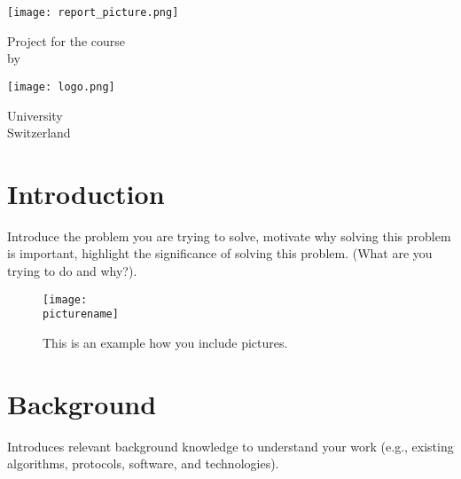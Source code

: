 \documentclass{article} %
\begin{document}
\begin{titlepage}
    \begin{center}
        \vspace*{1cm}

        \Huge
        \textbf{\titlename}

        \vspace{0.5cm}
        \LARGE
        \subtitlename

        \vspace{1.5cm}

        \texttt{[image: report\_picture.png]}

        \vspace{1.5cm}

        Project for the course\\
        \course\hspace{0.01em} by\\
        \textbf{\authorname}

        \vfill
        \texttt{[image: logo.png]}

        \Large
        University \uniname\\
        Switzerland\\
        \semester

    \end{center}
\end{titlepage}

\tableofcontents
\clearpage

\section{Introduction}
Introduce the problem you are trying to solve, motivate why solving this
problem is important, highlight the significance of solving this problem. (What are you trying to
do and why?).\\
\lipsum[1-1] %

\begin{figure}[h]
    \centering
    \texttt{[image: \\picturename]}
    \caption{This is an example how you include pictures.}
    \label{fig:example}
\end{figure}

\section{Background}
Introduces relevant background knowledge to understand your work (e.g.,
existing algorithms, protocols, software, and technologies).\\
\lipsum[1-1] %
\clearpage
\end{document}
